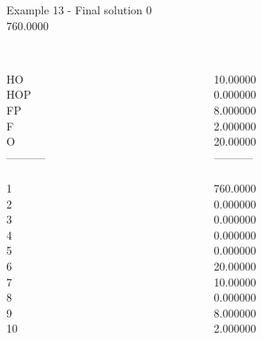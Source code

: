 \begin{frame}{Example 13 - Final solution}
\footnotesize
{}  0\\
  760.0000\\

\begin{columns}[t]
\begin{column}{0.3\textwidth}
\\
HO\\
HOP\\
FP\\
F\\
O\\
-----------\\
\\
1\\
2\\
3\\
4\\
5\\
6\\
7\\
8\\
9\\
10\\

\end{column}
\begin{column}{0.3\textwidth}
\\
10.00000\\
0.000000\\
8.000000\\
2.000000\\
20.00000\\
-----------\\
\\
760.0000\\
0.000000\\
0.000000\\
0.000000\\
0.000000\\
20.00000\\
10.00000\\
0.000000\\
8.000000\\
2.000000\\
\end{column}  


\end{columns}
\end{frame}
